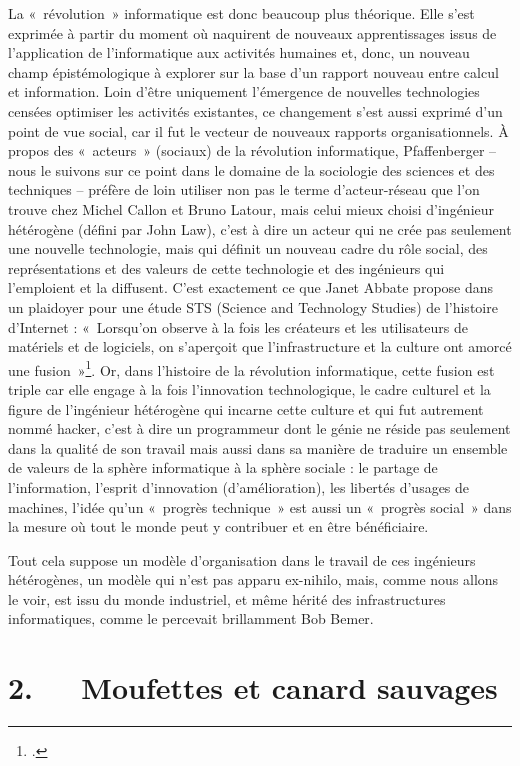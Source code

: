 \documentclass{FramateX}
\begin{document}
\begin{refsection}
La «~révolution~» informatique est donc beaucoup plus théorique. Elle
s'est exprimée à partir du moment où naquirent de nouveaux
apprentissages issus de l'application de l'informatique aux activités
humaines et, donc, un nouveau champ épistémologique à explorer sur la
base d'un rapport nouveau entre calcul et information. Loin d'être
uniquement l'émergence de nouvelles technologies censées optimiser les
activités existantes, ce changement s'est aussi exprimé d'un point de
vue social, car il fut le vecteur de nouveaux rapports
organisationnels. À propos des «~acteurs~» (sociaux) de la révolution
informatique, Pfaffenberger -- nous le suivons sur ce point dans le
domaine de la sociologie des sciences et des techniques -- préfère de
loin utiliser non pas le terme d'acteur-réseau que l'on trouve chez
Michel Callon et Bruno Latour, mais celui mieux choisi d'ingénieur
hétérogène (défini par John Law), c'est à dire un acteur qui ne crée
pas seulement une nouvelle technologie, mais qui définit un nouveau
cadre du rôle social, des représentations et des valeurs de cette
technologie et des ingénieurs qui l'emploient et la diffusent. C'est
exactement ce que Janet Abbate propose dans un plaidoyer pour une étude
STS (Science and Technology Studies) de l'histoire d'Internet :
«~Lorsqu'on observe à la fois les créateurs et les utilisateurs de
matériels et de logiciels, on s'aperçoit que l'infrastructure et la
culture ont amorcé une fusion~»\footnote{\cite{abbatehistoire2012}.}. Or, dans l'histoire de la révolution informatique, cette
fusion est triple car elle engage à la fois l'innovation technologique,
le cadre culturel et la figure de l'ingénieur hétérogène qui incarne
cette culture et qui fut autrement nommé hacker, c'est à dire un
programmeur dont le génie ne réside pas seulement dans la qualité de
son travail mais aussi dans sa manière de traduire un ensemble de
valeurs de la sphère informatique à la sphère sociale : le partage de
l'information, l'esprit d'innovation (d'amélioration), les libertés
d'usages de machines, l'idée qu'un «~progrès technique~» est aussi un
«~progrès social~» dans la mesure où tout le monde peut y contribuer et
en être bénéficiaire. 

Tout cela suppose un modèle d'organisation dans le travail de ces
ingénieurs hétérogènes, un modèle qui n'est pas apparu ex-nihilo, mais,
comme nous allons le voir, est issu du monde industriel, et même hérité
des infrastructures informatiques, comme le percevait brillamment Bob
Bemer.

\section*{2.~~~Moufettes et canard sauvages}
{}


\end{refsection}
\end{document}
